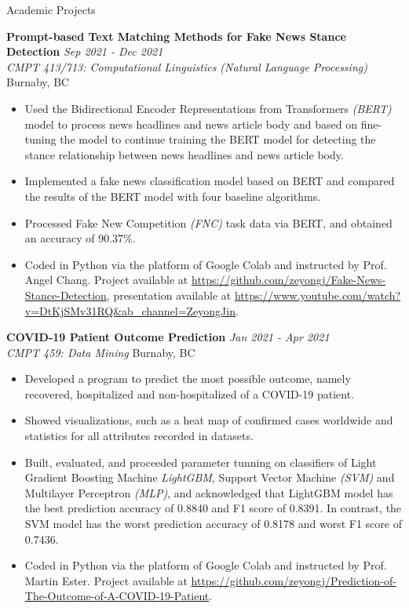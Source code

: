 \documentclass{resume} %
\begin{document}
\begin{rSection}{Academic Projects}

{\bf Prompt-based Text Matching Methods for Fake News Stance Detection} \hfill {\em Sep 2021 - Dec 2021} 
\\{\textit{CMPT 413/713: Computational Linguistics (Natural Language Processing)} \hfill {Burnaby, BC}}
\begin{itemize}
    \vspace{-0.2cm}\item Used the Bidirectional Encoder Representations from Transformers \textit{(BERT)} model to process news headlines and news article body and based on fine-tuning the model to continue training the BERT model for detecting the stance relationship between news headlines and news article body. 
    \vspace{-0.2cm}\item Implemented a fake news classification model based on BERT and compared the results of the BERT model with four baseline algorithms. 
    \vspace{-0.2cm}\item Processed Fake New Competition \textit{(FNC)} task data via BERT, and obtained an accuracy of 90.37\%.
    \vspace{-0.2cm}\item Coded in Python via the platform of Google Colab and instructed by Prof. Angel Chang. Project available at \url{https://github.com/zeyongj/Fake-News-Stance-Detection}, presentation available at \url{https://www.youtube.com/watch?v=DtKjSMv31RQ&ab_channel=ZeyongJin}.
\end{itemize}

{\bf COVID-19 Patient Outcome Prediction} \hfill {\em Jan 2021 - Apr 2021} 
\\{\textit{CMPT 459: Data Mining} \hfill {Burnaby, BC}}
\begin{itemize}
    \vspace{-0.2cm}\item Developed a program to predict the most possible outcome, namely recovered, hospitalized and non-hospitalized of a COVID-19 patient.
    \vspace{-0.2cm}\item Showed visualizations, such as a heat map of confirmed cases worldwide and statistics for all attributes recorded in datasets. 
    \vspace{-0.2cm}\item Built, evaluated, and proceeded parameter tunning on classifiers of Light Gradient Boosting Machine \textit{LightGBM}, Support Vector Machine \textit{(SVM)} and Multilayer Perceptron \textit{(MLP)}, and acknowledged that LightGBM model has the best prediction accuracy of 0.8840 and F1 score of 0.8391. In contrast, the SVM model has the worst prediction accuracy of 0.8178 and worst F1 score of 0.7436.
    \vspace{-0.2cm}\item Coded in Python via the platform of Google Colab and instructed by Prof. Martin Ester. Project available at \url{https://github.com/zeyongj/Prediction-of-The-Outcome-of-A-COVID-19-Patient}.
\end{itemize}


\end{rSection}
\end{document}

